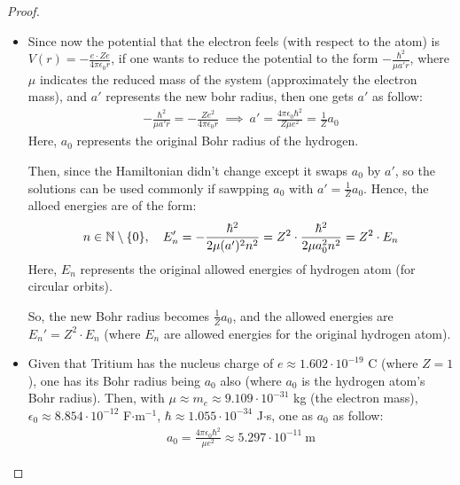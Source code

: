 \documentclass{article}
\begin{document}
\begin{proof}

    \hfil
    
    \begin{itemize}
        \item[(a)] Since now the potential that the electron feels (with respect to the atom) is $V(r) = -\frac{e\cdot Z e}{4\pi\epsilon_0 r}$, if one wants to reduce the potential to the form $-\frac{\hbar^2}{\mu a' r}$, where $\mu$ indicates the reduced mass of the system (approximately the electron mass), and $a'$ represents the new bohr radius, then one gets $a'$ as follow:
        \begin{align}
            -\frac{\hbar^2}{\mu a' r} = -\frac{Z e^2}{4\pi\epsilon_0 r}\ \implies\ a' = \frac{4\pi\epsilon_0\hbar^2}{Z\mu e^2} = \frac{1}{Z}a_0
        \end{align}
        Here, $a_0$ represents the original Bohr radius of the hydrogen.

        Then, since the Hamiltonian didn't change except it swaps $a_0$ by $a'$, so the solutions can be used commonly if sawpping $a_0$ with $a' = \frac{1}{Z}a_0$. Hence, the alloed energies are of the form:
        \begin{align}
            n\in\mathbb{N}\setminus\{0\},\quad E_n' = -\frac{\hbar^2}{2\mu (a')^2n^2} = Z^2\cdot \frac{\hbar^2}{2\mu a_0^2 n^2} = Z^2\cdot E_n
        \end{align}
        Here, $E_n$ represents the original allowed energies of hydrogen atom (for circular orbits).

        So, the new Bohr radius becomes $\frac{1}{Z}a_0$, and the allowed energies are $E_n' = Z^2\cdot E_n$ (where $E_n$ are allowed energies for the original hydrogen atom).

        \hfil

        \item[(b)] Given that Tritium has the nucleus charge of $e\approx 1.602\cdot 10^{-19}$ C (where $Z=1$), one has its Bohr radius being $a_0$ also (where $a_0$ is the hydrogen atom's Bohr radius). Then, with $\mu \approx m_e\approx 9.109\cdot 10^{-31}$ kg (the electron mass), $\epsilon_0\approx 8.854\cdot 10^{-12}$ F$\cdot$m$^{-1}$, $\hbar \approx 1.055\cdot 10^{-34}$ J$\cdot$s, one as $a_0$ as follow:
        \begin{align}
            a_0=\frac{4\pi\epsilon_0\hbar^2}{\mu e^2}\approx 5.297\cdot 10^{-11}\ \text{m}
        \end{align}

        \hfil


\end{itemize}
\end{proof}
\end{document}
